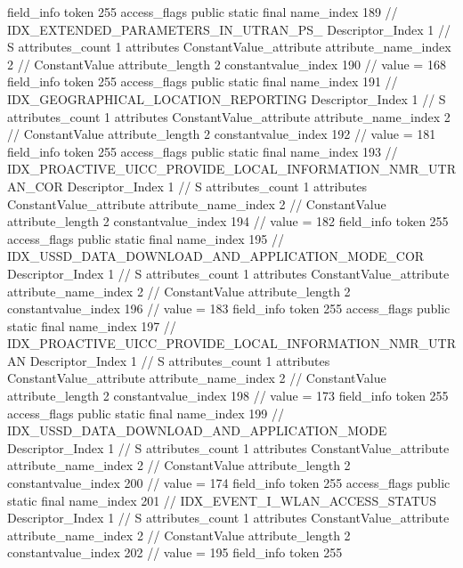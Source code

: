 {{{{{{{				}
				}
			}
			field_info {
				token	255
				access_flags	public static final
				name_index	189		// IDX_EXTENDED_PARAMETERS_IN_UTRAN_PS_
				Descriptor_Index	1		// S
				attributes_count	1
				attributes {
				ConstantValue_attribute {
					attribute_name_index	2		// ConstantValue
					attribute_length	2
					constantvalue_index	190		// value = 168
				}
				}
			}
			field_info {
				token	255
				access_flags	public static final
				name_index	191		// IDX_GEOGRAPHICAL_LOCATION_REPORTING
				Descriptor_Index	1		// S
				attributes_count	1
				attributes {
				ConstantValue_attribute {
					attribute_name_index	2		// ConstantValue
					attribute_length	2
					constantvalue_index	192		// value = 181
				}
				}
			}
			field_info {
				token	255
				access_flags	public static final
				name_index	193		// IDX_PROACTIVE_UICC_PROVIDE_LOCAL_INFORMATION_NMR_UTRAN_COR
				Descriptor_Index	1		// S
				attributes_count	1
				attributes {
				ConstantValue_attribute {
					attribute_name_index	2		// ConstantValue
					attribute_length	2
					constantvalue_index	194		// value = 182
				}
				}
			}
			field_info {
				token	255
				access_flags	public static final
				name_index	195		// IDX_USSD_DATA_DOWNLOAD_AND_APPLICATION_MODE_COR
				Descriptor_Index	1		// S
				attributes_count	1
				attributes {
				ConstantValue_attribute {
					attribute_name_index	2		// ConstantValue
					attribute_length	2
					constantvalue_index	196		// value = 183
				}
				}
			}
			field_info {
				token	255
				access_flags	public static final
				name_index	197		// IDX_PROACTIVE_UICC_PROVIDE_LOCAL_INFORMATION_NMR_UTRAN
				Descriptor_Index	1		// S
				attributes_count	1
				attributes {
				ConstantValue_attribute {
					attribute_name_index	2		// ConstantValue
					attribute_length	2
					constantvalue_index	198		// value = 173
				}
				}
			}
			field_info {
				token	255
				access_flags	public static final
				name_index	199		// IDX_USSD_DATA_DOWNLOAD_AND_APPLICATION_MODE
				Descriptor_Index	1		// S
				attributes_count	1
				attributes {
				ConstantValue_attribute {
					attribute_name_index	2		// ConstantValue
					attribute_length	2
					constantvalue_index	200		// value = 174
				}
				}
			}
			field_info {
				token	255
				access_flags	public static final
				name_index	201		// IDX_EVENT_I_WLAN_ACCESS_STATUS
				Descriptor_Index	1		// S
				attributes_count	1
				attributes {
				ConstantValue_attribute {
					attribute_name_index	2		// ConstantValue
					attribute_length	2
					constantvalue_index	202		// value = 195
				}
				}
			}
			field_info {
				token	255
}}}}}
